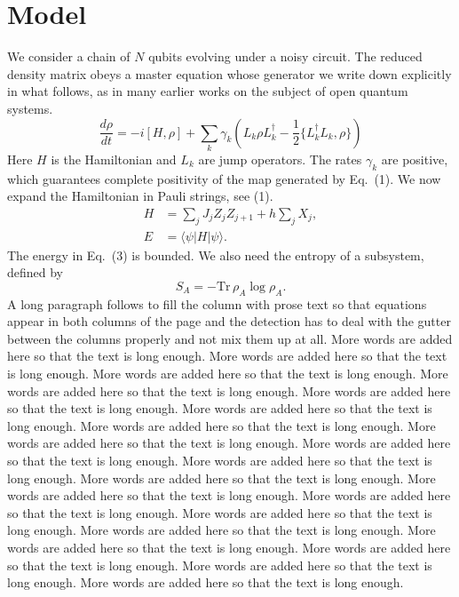 \documentclass[twocolumn,10pt]{article}
\begin{document}
\section{Model}
We consider a chain of $N$ qubits evolving under a noisy circuit. The reduced density matrix obeys a master equation whose generator we write down explicitly in what follows, as in many earlier works on the subject of open quantum systems.
\begin{equation}
\frac{d\rho}{dt} = -i[H,\rho] + \sum_k \gamma_k \left( L_k \rho L_k^\dagger - \frac{1}{2}\{L_k^\dagger L_k, \rho\} \right)
\label{eq:lindblad}
\end{equation}
Here $H$ is the Hamiltonian and $L_k$ are jump operators. The rates $\gamma_k$ are positive, which guarantees complete positivity of the map generated by Eq.~(1). We now expand the Hamiltonian in Pauli strings, see (1).
\begin{align}
H &= \sum_{j} J_j Z_j Z_{j+1} + h \sum_j X_j, \\
E &= \langle \psi | H | \psi \rangle .
\end{align}
The energy in Eq.~(3) is bounded. We also need the entropy of a subsystem, defined by
\begin{equation}
S_A = -\mathrm{Tr}\, \rho_A \log \rho_A .
\end{equation}
A long paragraph follows to fill the column with prose text so that equations appear in both columns of the page and the detection has to deal with the gutter between the columns properly and not mix them up at all. More words are added here so that the text is long enough. More words are added here so that the text is long enough. More words are added here so that the text is long enough. More words are added here so that the text is long enough. More words are added here so that the text is long enough. More words are added here so that the text is long enough. More words are added here so that the text is long enough. More words are added here so that the text is long enough. More words are added here so that the text is long enough. More words are added here so that the text is long enough. More words are added here so that the text is long enough. More words are added here so that the text is long enough. More words are added here so that the text is long enough. More words are added here so that the text is long enough. More words are added here so that the text is long enough. More words are added here so that the text is long enough. More words are added here so that the text is long enough. More words are added here so that the text is long enough. More words are added here so that the text is long enough.
\end{document}
